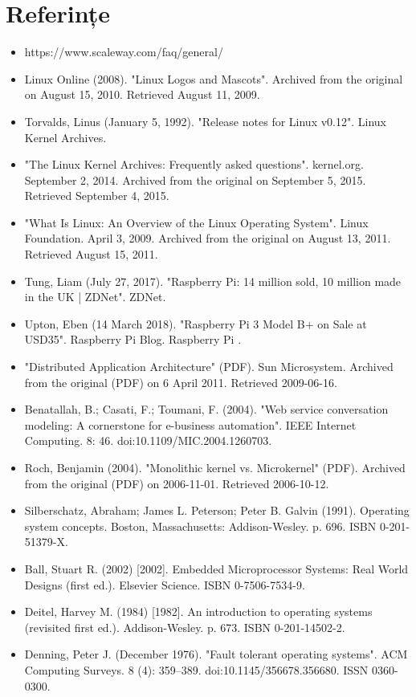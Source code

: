 \documentclass[a4paper, 12pt, twoside]{report}
\begin{document}
{\lstlistoflistings

\chapter{Referințe}
\begin{itemize}
\item https://www.scaleway.com/faq/general/
\item Linux Online (2008). "Linux Logos and Mascots". Archived from the original on August 15, 2010. Retrieved August 11, 2009.
\item Torvalds, Linus (January 5, 1992). "Release notes for Linux v0.12". Linux Kernel Archives.
\item "The Linux Kernel Archives: Frequently asked questions". kernel.org. September 2, 2014. Archived from the original on September 5, 2015. Retrieved September 4, 2015.
\item "What Is Linux: An Overview of the Linux Operating System". Linux Foundation. April 3, 2009. Archived from the original on August 13, 2011. Retrieved August 15, 2011.
\item Tung, Liam (July 27, 2017). "Raspberry Pi: 14 million sold, 10 million made in the UK | ZDNet". ZDNet.
\item Upton, Eben (14 March 2018). "Raspberry Pi 3 Model B+ on Sale at USD35". Raspberry Pi Blog. Raspberry Pi .
\item  "Distributed Application Architecture" (PDF). Sun Microsystem. Archived from the original (PDF) on 6 April 2011. Retrieved 2009-06-16.
\item Benatallah, B.; Casati, F.; Toumani, F. (2004). "Web service conversation modeling: A cornerstone for e-business automation". IEEE Internet Computing. 8: 46. doi:10.1109/MIC.2004.1260703.
\item Roch, Benjamin (2004). "Monolithic kernel vs. Microkernel" (PDF). Archived from the original (PDF) on 2006-11-01. Retrieved 2006-10-12.
\item Silberschatz, Abraham; James L. Peterson; Peter B. Galvin (1991). Operating system concepts. Boston, Massachusetts: Addison-Wesley. p. 696. ISBN 0-201-51379-X.
\item Ball, Stuart R. (2002) [2002]. Embedded Microprocessor Systems: Real World Designs (first ed.). Elsevier Science. ISBN 0-7506-7534-9.
\item Deitel, Harvey M. (1984) [1982]. An introduction to operating systems (revisited first ed.). Addison-Wesley. p. 673. ISBN 0-201-14502-2.
\item Denning, Peter J. (December 1976). "Fault tolerant operating systems". ACM Computing Surveys. 8 (4): 359–389. doi:10.1145/356678.356680. ISSN 0360-0300.

\end{itemize}}
\end{document}
